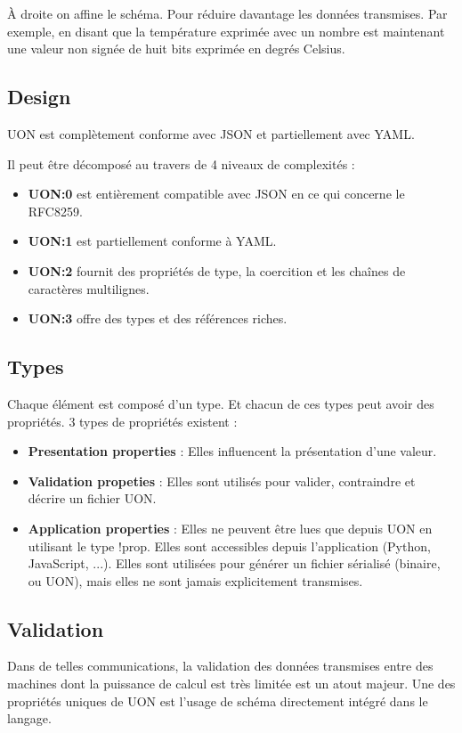 \documentclass[
    iict, %
    il, %
]{heig-tb}
\begin{document}
À droite on affine le schéma. Pour réduire davantage les données transmises.
Par exemple, en disant que la température exprimée avec un nombre est maintenant une valeur non signée de huit bits exprimée en degrés Celsius.

\subsection{Design}
UON est complètement conforme avec JSON et partiellement avec YAML.

Il peut être décomposé au travers de 4 niveaux de complexités :
\begin{itemize}
    \item \textbf{UON:0} est entièrement compatible avec JSON en ce qui concerne le RFC8259.
    \item \textbf{UON:1} est partiellement conforme à YAML.
    \item \textbf{UON:2} fournit des propriétés de type, la coercition et les chaînes de caractères multilignes.
    \item \textbf{UON:3} offre des types et des références riches.
\end{itemize}

\subsection{Types}
Chaque élément est composé d'un type. Et chacun de ces types peut avoir des propriétés.
3 types de propriétés existent :
\begin{itemize}
    \item \textbf{Presentation properties} : Elles influencent la présentation d'une valeur.
    \item \textbf{Validation propeties} : Elles sont utilisés pour valider, contraindre et décrire un fichier UON.
    \item \textbf{Application properties} : Elles ne peuvent être lues que depuis UON en utilisant le type !prop. Elles sont accessibles depuis l'application (Python, JavaScript, ...). Elles sont utilisées pour générer un fichier sérialisé (binaire, ou UON), mais elles ne sont jamais explicitement transmises.
\end{itemize}

\subsection{Validation}
Dans de telles communications, la validation des données transmises entre des machines dont la puissance de calcul est très limitée est un atout majeur.
Une des propriétés uniques de UON est l'usage de schéma directement intégré dans le langage.
\end{document}
